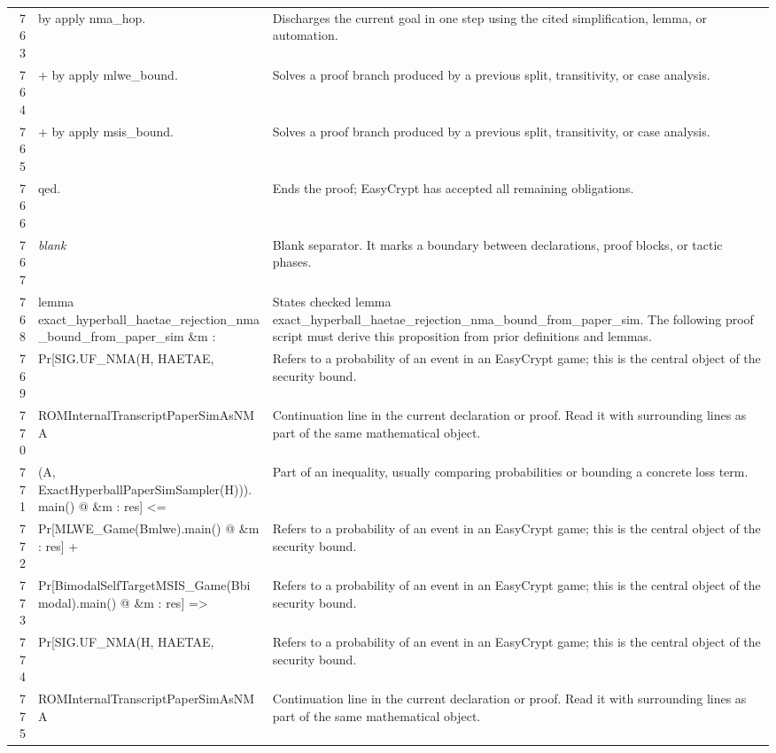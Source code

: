 \documentclass[10pt]{article}
\begin{document}
\begin{longtable}{r L{0.53\textwidth} L{0.37\textwidth}}
763 & {\ttfamily\scriptsize   by apply nma\_hop.} & Discharges the current goal in one step using the cited simplification, lemma, or automation. \\
764 & {\ttfamily\scriptsize + by apply mlwe\_bound.} & Solves a proof branch produced by a previous split, transitivity, or case analysis. \\
765 & {\ttfamily\scriptsize + by apply msis\_bound.} & Solves a proof branch produced by a previous split, transitivity, or case analysis. \\
766 & {\ttfamily\scriptsize qed.} & Ends the proof; EasyCrypt has accepted all remaining obligations. \\
767 & {\ttfamily\scriptsize \emph{blank}} & Blank separator.  It marks a boundary between declarations, proof blocks, or tactic phases. \\
768 & {\ttfamily\scriptsize lemma exact\_hyperball\_haetae\_rejection\_nma\_bound\_from\_paper\_sim \&m :} & States checked lemma exact\_hyperball\_haetae\_rejection\_nma\_bound\_from\_paper\_sim.  The following proof script must derive this proposition from prior definitions and lemmas. \\
769 & {\ttfamily\scriptsize   Pr[SIG.UF\_NMA(H, HAETAE,} & Refers to a probability of an event in an EasyCrypt game; this is the central object of the security bound. \\
770 & {\ttfamily\scriptsize        ROMInternalTranscriptPaperSimAsNMA} & Continuation line in the current declaration or proof.  Read it with surrounding lines as part of the same mathematical object. \\
771 & {\ttfamily\scriptsize          (A, ExactHyperballPaperSimSampler(H))).main() @ \&m : res] <=} & Part of an inequality, usually comparing probabilities or bounding a concrete loss term. \\
772 & {\ttfamily\scriptsize     Pr[MLWE\_Game(Bmlwe).main() @ \&m : res] +} & Refers to a probability of an event in an EasyCrypt game; this is the central object of the security bound. \\
773 & {\ttfamily\scriptsize     Pr[BimodalSelfTargetMSIS\_Game(Bbimodal).main() @ \&m : res] =>} & Refers to a probability of an event in an EasyCrypt game; this is the central object of the security bound. \\
774 & {\ttfamily\scriptsize   Pr[SIG.UF\_NMA(H, HAETAE,} & Refers to a probability of an event in an EasyCrypt game; this is the central object of the security bound. \\
775 & {\ttfamily\scriptsize        ROMInternalTranscriptPaperSimAsNMA} & Continuation line in the current declaration or proof.  Read it with surrounding lines as part of the same mathematical object. \\

\end{longtable}
\end{document}
